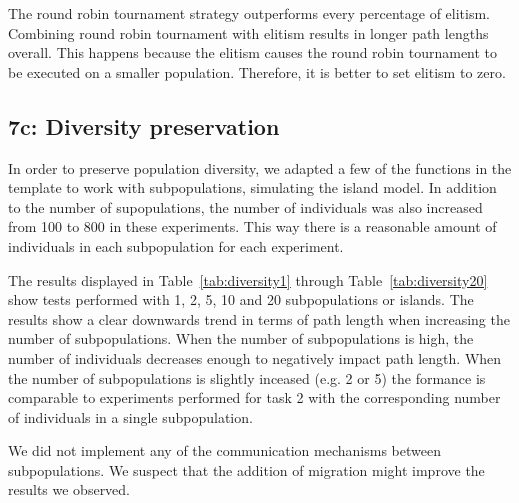\documentclass{report}
\begin{document}
The round robin tournament strategy outperforms every percentage of elitism. Combining round robin tournament with elitism results in longer path lengths overall. This happens because the elitism causes the round robin tournament to be executed on a smaller population. Therefore, it is better to set elitism to zero.


\subsection{7c: Diversity preservation}
In order to preserve population diversity, we adapted a few of the functions in the template to work with subpopulations, simulating the island model. In addition to the number of supopulations, the number of individuals was also increased from 100 to 800 in these experiments. This way there is a reasonable amount of individuals in each subpopulation for each experiment. 

The results displayed in Table~\ref{tab:diversity1} through Table~\ref{tab:diversity20} show tests performed with 1, 2, 5, 10 and 20 subpopulations or islands. The results show a clear downwards trend in terms of path length when increasing the number of subpopulations. When the number of subpopulations is high, the number of individuals decreases enough to negatively impact path length. When the number of subpopulations is slightly inceased (e.g. 2 or 5) the formance is comparable to experiments performed for task 2 with the corresponding number of individuals in a single subpopulation.


We did not implement any of the communication mechanisms between subpopulations. We suspect that the addition of migration might improve the results we observed.
\end{document}
